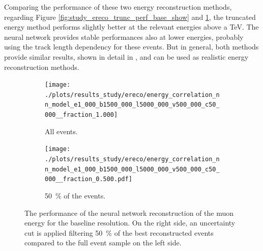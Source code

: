 Comparing the performance of these two energy reconstruction methods, regarding Figure \ref{fig:study_ereco_trunc_perf_base_show} and \ref{fig:study_ereco_nn_base_perform_all_show}, the truncated energy method performs slightly better at the relevant energies above a TeV.
The neural network provides stable performances also at lower energies, probably using the track length dependency for these events.
But in general, both methods provide similar results, shown in detail in , and can be used as realistic energy reconstruction methods.
\begin{figure}
    \centering
    \begin{subfigure}{0.47\textwidth}
        \centering
        \texttt{[image: ./plots/results\_study/ereco/energy\_correlation\_nn\_model\_e1\_000\_b1500\_000\_l5000\_000\_v500\_000\_c50\_000\_\_fraction\_1.000]}
        \caption{All events.}
        \label{fig:study_ereco_nn_base_perform_all_show}
    \end{subfigure}
    \hfill
    \begin{subfigure}{0.47\textwidth}
        \centering
        \texttt{[image: ./plots/results\_study/ereco/energy\_correlation\_nn\_model\_e1\_000\_b1500\_000\_l5000\_000\_v500\_000\_c50\_000\_\_fraction\_0.500.pdf]}
        \caption{\SI{50}{\%} of the events.}
        \label{fig:study_ereco_nn_base_perform_0.5_show}
    \end{subfigure}
    \caption{The performance of the neural network reconstruction of the muon energy for the baseline resolution. On the right side, an uncertainty cut is applied filtering \SI{50}{\%} of the best reconstructed events compared to the full event sample on the left side.}
    \label{fig:study_ereco_nn_base_perform}
\end{figure}
